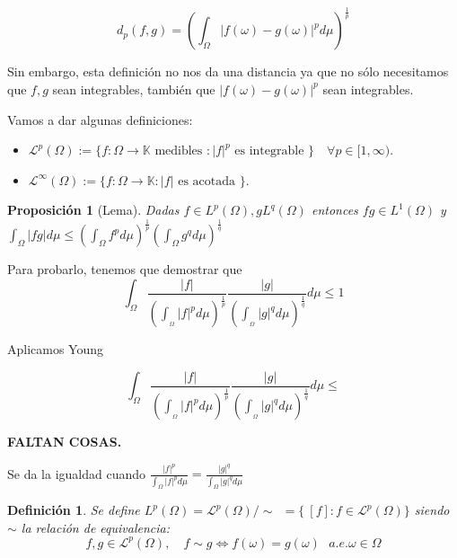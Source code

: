 \documentclass[11pt, a4paper]{article}
\makeatletter
\newif\IfInSansMode
\let\oldsf\sffamily
\renewcommand*{\sffamily}{\oldsf\mathversion{sans}\InSansModetrue}
\let\oldnorm\normalfont
\renewcommand*{\normalfont}{\oldnorm\InSansModefalse\mathversion{normal}}
\providecommand{\abs}[1]{\lvert#1\rvert}
\renewenvironment{proof}[1][\proofname] {\par\pushQED{\qed}\normalfont\topsep6\p@\@plus6\p@\relax\trivlist\item[\hskip\labelsep\itshape\sffamily#1\@addpunct{.}]\ignorespaces}{\popQED\endtrivlist\@endpefalse}
\theoremstyle{theorem-style}
\newtheorem{nprop}{Proposición}[section]
\theoremstyle{definition-style}
\newtheorem{ndef}{Definición}[section]
\theoremstyle{remark-style}
\theoremstyle{example-style}
\makeatother
\begin{document}
$$d_p (f, g) = \left( \int_{\Omega} \abs{f(\omega) - g(\omega)}^p d \mu \right)^{\frac{1}{p}}$$

Sin embargo, esta definición no nos da una distancia ya que no sólo necesitamos que $f, g$ sean integrables, también que $\abs{f(\omega) - g(\omega)}^p$ sean integrables.

Vamos a dar algunas definiciones:

\begin{itemize}
\item $\mathcal L^p (\Omega) := \{ f: \Omega \rightarrow \mathbb K \text{ medibles } : \abs{f}^p \text{ es integrable } \}\quad \forall p \in [1, \infty)$.
\item $\mathcal L^{\infty} (\Omega) := \{ f: \Omega \rightarrow \mathbb K : \abs{f} \text{ es acotada } \}$.
\end{itemize}

\begin{nprop}[Lema]
  Dadas $f \in L^p (\Omega), g L^q (\Omega)$ entonces $fg \in L^1 (\Omega)$ y $ \displaystyle \int_{\Omega} \abs{fg}d \mu \leq \left( \int_{\Omega} f^p d \mu \right)^{\frac{1}{p}}\left( \int_{\Omega} g^q d \mu \right)^{\frac{1}{q}}$
\end{nprop}

\begin{proof}
  Para probarlo, tenemos que demostrar que $$ \int_{\Omega} \frac{|f|}{\left( \int_{_\Omega} |f|^p d \mu \right)^{\frac{1}{p}}} \frac{|g|}{\left( \int_{_\Omega} |g|^q d \mu \right)^{\frac{1}{q}}} d \mu \leq 1$$
  
  Aplicamos Young
  
  $$\int_{\Omega} \frac{|f|}{\left( \int_{_\Omega} |f|^p d \mu \right)^{\frac{1}{p}}} \frac{|g|}{\left( \int_{_\Omega} |g|^q d \mu \right)^{\frac{1}{q}}} d \mu \leq $$
  
  \textbf{FALTAN COSAS.}
  
  Se da la igualdad cuando $\displaystyle \frac{|f|^p}{\int_{\Omega} |f|^p d \mu } = \frac{|g|^q}{\int_{\Omega} |g|^q d \mu }$
\end{proof}

\begin{ndef}
  Se define $L^p(\Omega) = \mathcal{L}^p(\Omega)/\sim \ \ = \{ \ [f] : f \in \mathcal{L}^p(\Omega) \} $ siendo $\sim$ la relación de equivalencia:
  \[
    f,g\in \mathcal{L}^p(\Omega), \quad f\sim  g \iff f(\omega)= g(\omega) \ \ \ a.e. \omega \in \Omega
  \]
  
\end{ndef}
\end{document}

